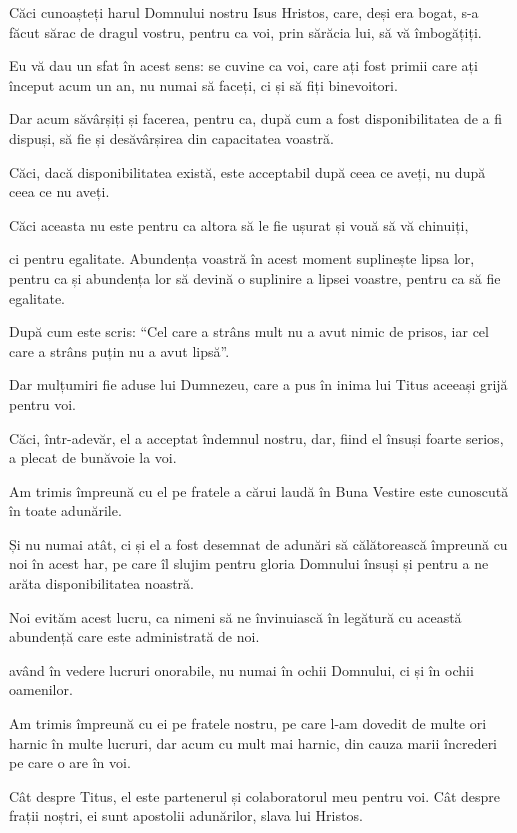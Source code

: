 {Căci cunoașteți harul Domnului nostru Isus Hristos, care, deși era bogat, s-a făcut sărac de dragul vostru, pentru ca voi, prin sărăcia lui, să vă îmbogățiți.

Eu vă dau un sfat în acest sens: se cuvine ca voi, care ați fost primii care ați început acum un an, nu numai să faceți, ci și să fiți binevoitori.

Dar acum săvârșiți și facerea, pentru ca, după cum a fost disponibilitatea de a fi dispuși, să fie și desăvârșirea din capacitatea voastră.

Căci, dacă disponibilitatea există, este acceptabil după ceea ce aveți, nu după ceea ce nu aveți.

Căci aceasta nu este pentru ca altora să le fie ușurat și vouă să vă chinuiți,

ci pentru egalitate. Abundența voastră în acest moment suplinește lipsa lor, pentru ca și abundența lor să devină o suplinire a lipsei voastre, pentru ca să fie egalitate.

După cum este scris: “Cel care a strâns mult nu a avut nimic de prisos, iar cel care a strâns puțin nu a avut lipsă”.


\par }{\PP {}Dar mulțumiri fie aduse lui Dumnezeu, care a pus în inima lui Titus aceeași grijă pentru voi.

Căci, într-adevăr, el a acceptat îndemnul nostru, dar, fiind el însuși foarte serios, a plecat de bunăvoie la voi.

Am trimis împreună cu el pe fratele a cărui laudă în Buna Vestire este cunoscută în toate adunările.

Și nu numai atât, ci și el a fost desemnat de adunări să călătorească împreună cu noi în acest har, pe care îl slujim pentru gloria Domnului însuși și pentru a ne arăta disponibilitatea noastră.

Noi evităm acest lucru, ca nimeni să ne învinuiască în legătură cu această abundență care este administrată de noi.

având în vedere lucruri onorabile, nu numai în ochii Domnului, ci și în ochii oamenilor.

Am trimis împreună cu ei pe fratele nostru, pe care l-am dovedit de multe ori harnic în multe lucruri, dar acum cu mult mai harnic, din cauza marii încrederi pe care o are în voi.

Cât despre Titus, el este partenerul și colaboratorul meu pentru voi. Cât despre frații noștri, ei sunt apostolii adunărilor, slava lui Hristos.

}
